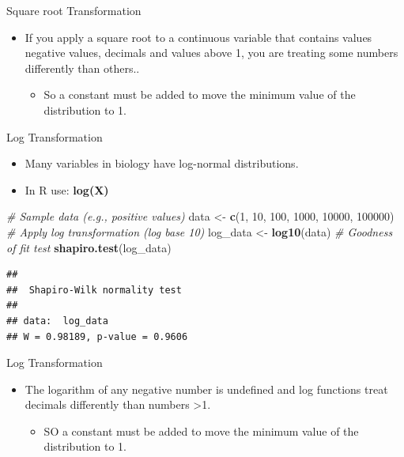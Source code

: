 \documentclass[
  ignorenonframetext,
]{beamer}
\newenvironment{Shaded}{\begin{snugshade}}{\end{snugshade}}
\newcommand{\CommentTok}[1]{\textcolor[rgb]{0.56,0.35,0.01}{\textit{#1}}}
\newcommand{\DecValTok}[1]{\textcolor[rgb]{0.00,0.00,0.81}{#1}}
\newcommand{\FunctionTok}[1]{\textcolor[rgb]{0.13,0.29,0.53}{\textbf{#1}}}
\newcommand{\NormalTok}[1]{#1}
\newcommand{\OtherTok}[1]{\textcolor[rgb]{0.56,0.35,0.01}{#1}}
\providecommand{\tightlist}{%
  \setlength{\itemsep}{0pt}\setlength{\parskip}{0pt}}
\begin{document}
\begin{frame}{Square root Transformation}
\label{square-root-transformation-1}
\begin{itemize}
\tightlist
\item
  If you apply a square root to a continuous variable that contains
  values negative values, decimals and values above 1, you are treating
  some numbers differently than others..

  \begin{itemize}
  \tightlist
  \item
    So a constant must be added to move the minimum value of the
    distribution to 1.
  \end{itemize}
\end{itemize}
\end{frame}

\begin{frame}[fragile]{Log Transformation}
\label{log-transformation}
\begin{itemize}
\item
  Many variables in biology have log-normal distributions.
\item
  In R use: \textbf{log(X)}
\end{itemize}

\begin{Shaded}
\begin{Highlighting}[]
\CommentTok{\# Sample data (e.g., positive values)}
\NormalTok{data }\OtherTok{\textless{}{-}} \FunctionTok{c}\NormalTok{(}\DecValTok{1}\NormalTok{, }\DecValTok{10}\NormalTok{, }\DecValTok{100}\NormalTok{, }\DecValTok{1000}\NormalTok{, }\DecValTok{10000}\NormalTok{, }\DecValTok{100000}\NormalTok{)}
\CommentTok{\# Apply log transformation (log base 10)}
\NormalTok{log\_data }\OtherTok{\textless{}{-}} \FunctionTok{log10}\NormalTok{(data)}
\CommentTok{\# Goodness of fit test}
\FunctionTok{shapiro.test}\NormalTok{(log\_data)}
\end{Highlighting}
\end{Shaded}

\begin{verbatim}
## 
##  Shapiro-Wilk normality test
## 
## data:  log_data
## W = 0.98189, p-value = 0.9606
\end{verbatim}
\end{frame}

\begin{frame}{Log Transformation}
\label{log-transformation-1}
\begin{itemize}
\tightlist
\item
  The logarithm of any negative number is undefined and log functions
  treat decimals differently than numbers \textgreater1.

  \begin{itemize}
  \tightlist
  \item
    SO a constant must be added to move the minimum value of the
    distribution to 1.
  \end{itemize}
\end{itemize}
\end{frame}
\end{document}
